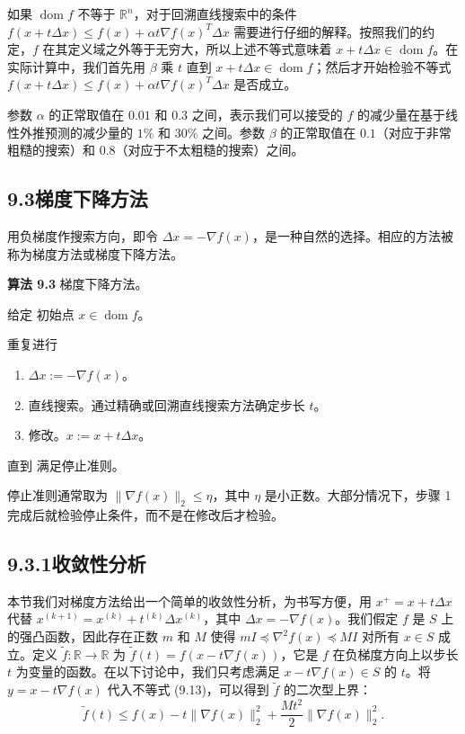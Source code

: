 \documentclass[UTF8, 12pt, fontset=fandol, oneside]{ctexart}
\begin{document}
如果 $\operatorname{dom} f$ 不等于 $\mathbb{R}^n$，对于回溯直线搜索中的条件 $f(x+t\Delta x)\leq f(x)+\alpha t\nabla f(x)^T\Delta x$ 需要进行仔细的解释。按照我们的约定，$f$ 在其定义域之外等于无穷大，所以上述不等式意味着 $x+t\Delta x\in\operatorname{dom} f$。在实际计算中，我们首先用 $\beta$ 乘 $t$ 直到 $x+t\Delta x\in\operatorname{dom} f$；然后才开始检验不等式 $f(x+t\Delta x)\leq f(x)+\alpha t\nabla f(x)^T\Delta x$ 是否成立。

参数 $\alpha$ 的正常取值在 $0.01$ 和 $0.3$ 之间，表示我们可以接受的 $f$ 的减少量在基于线性外推预测的减少量的 $1\%$ 和 $30\%$ 之间。参数 $\beta$ 的正常取值在 $0.1$（对应于非常粗糙的搜索）和 $0.8$（对应于不太粗糙的搜索）之间。

\subsection*{9.3\quad 梯度下降方法}

用负梯度作搜索方向，即令 $\Delta x=-\nabla f(x)$，是一种自然的选择。相应的方法被称为梯度方法或梯度下降方法。

\noindent\textbf{算法 9.3}\quad
梯度下降方法。

给定 初始点 $x\in\operatorname{dom} f$。

重复进行
\begin{enumerate}
\item $\Delta x:=-\nabla f(x)$。
\item 直线搜索。通过精确或回溯直线搜索方法确定步长 $t$。
\item 修改。$x:=x+t\Delta x$。
\end{enumerate}
直到 满足停止准则。

停止准则通常取为 $\|\nabla f(x)\|_2\leq\eta$，其中 $\eta$ 是小正数。大部分情况下，步骤 1 完成后就检验停止条件，而不是在修改后才检验。

\subsection*{9.3.1\quad 收敛性分析}

本节我们对梯度方法给出一个简单的收敛性分析，为书写方便，用 $x^+=x+t\Delta x$ 代替 $x^{(k+1)}=x^{(k)}+t^{(k)}\Delta x^{(k)}$，其中 $\Delta x=-\nabla f(x)$。我们假定 $f$ 是 $S$ 上的强凸函数，因此存在正数 $m$ 和 $M$ 使得 $mI\preceq\nabla^2 f(x)\preceq MI$ 对所有 $x\in S$ 成立。定义 $\tilde{f}:\mathbb{R}\to\mathbb{R}$ 为 $\tilde{f}(t)=f(x-t\nabla f(x))$，它是 $f$ 在负梯度方向上以步长 $t$ 为变量的函数。在以下讨论中，我们只考虑满足 $x-t\nabla f(x)\in S$ 的 $t$。将 $y=x-t\nabla f(x)$ 代入不等式 (9.13)，可以得到 $\tilde{f}$ 的二次型上界：
\begin{equation}
\tilde{f}(t)\leq f(x)-t\|\nabla f(x)\|_2^2+\frac{Mt^2}{2}\|\nabla f(x)\|_2^2.
\tag{9.17}
\end{equation}
\end{document}
